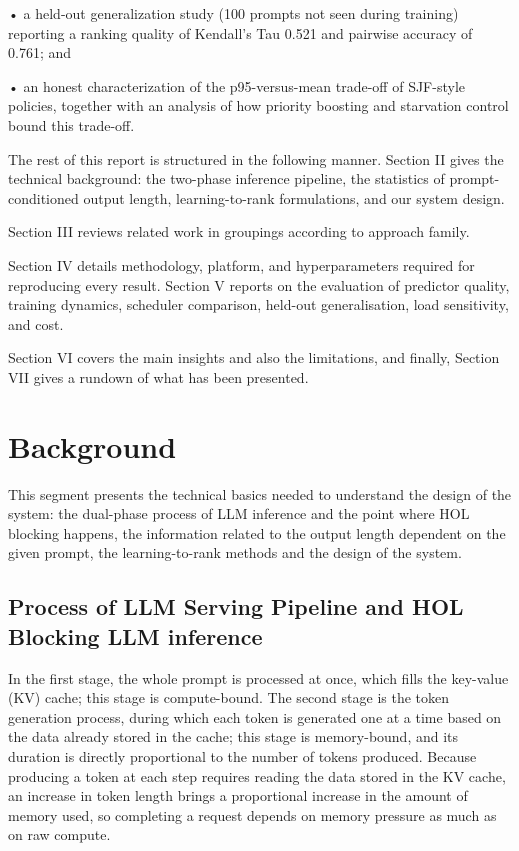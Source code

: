 \documentclass[conference]{IEEEtran}
\begin{document}
•   a held-out generalization study (100 prompts not seen during training) reporting a ranking quality of Kendall's Tau 0.521 and pairwise accuracy of 0.761; and

•  an honest characterization of the p95-versus-mean trade-off of SJF-style policies, together with an analysis of how priority boosting and starvation control bound this trade-off.

The rest of this report is structured in the following manner. Section II gives the technical background: the two-phase inference pipeline, the statistics of prompt-conditioned output length, learning-to-rank formulations, and our system design.

Section III reviews related work in groupings according to approach family.

Section IV details methodology, platform, and hyperparameters required for reproducing every result. Section V reports on the evaluation of predictor quality, training dynamics, scheduler comparison, held-out generalisation, load sensitivity, and cost.

Section VI covers the main insights and also the limitations, and finally, Section VII gives a rundown of what has been presented.

\clearpage
\section{Background}
This segment presents the technical basics needed to understand the design of the system: the dual-phase process of LLM inference and the point where HOL blocking happens, the information related to the output length dependent on the given prompt, the learning-to-rank methods and the design of the system.

\subsection{Process of LLM Serving Pipeline and HOL Blocking LLM inference}\label{AA}
 In the first stage, the whole prompt is processed at once, which fills the key-value (KV) cache; this stage is compute-bound. The second stage is the token generation process, during which each token is generated one at a time based on the data already stored in the cache; this stage is memory-bound, and its duration is directly proportional to the number of tokens produced. Because producing a token at each step requires reading the data stored in the KV cache, an increase in token length brings a proportional increase in the amount of memory used, so completing a request depends on memory pressure as much as on raw compute.
\end{document}
